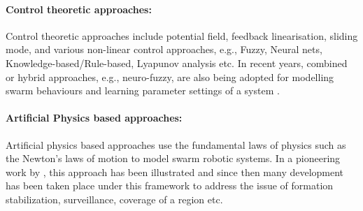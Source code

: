 \paragraph*{Control theoretic approaches:}
Control theoretic approaches include potential field, feedback linearisation, sliding mode, and various non-linear control approaches, e.g., Fuzzy, Neural nets, Knowledge-based/Rule-based, Lyapunov analysis etc. In recent years, combined or hybrid approaches, e.g., neuro-fuzzy, are also being adopted for modelling swarm behaviours and learning parameter settings of a system \cite{Sahin+2007}. 
\paragraph*{Artificial Physics based approaches:}
Artificial physics based approaches use the fundamental laws of physics such as the Newton's laws of motion to model swarm robotic systems. In a pioneering work by \cite{Spears+1999}, this approach has been illustrated and since then many development has been taken place under this framework to address the issue of formation stabilization, surveillance, coverage of a region etc.
